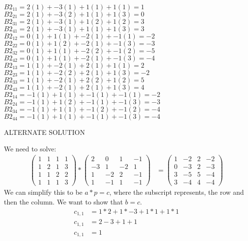 \documentclass[12pt]{article}
\begin{document}
\begin{itemize}
$B2_{11}=2(1)+-3(1)+1(1)+1(1)=1$
\newline $B2_{21}=2(1)+-3(2)+1(1)+1(3)=0$
\newline $B2_{31}=2(1)+-3(1)+1(2)+1(2)=3$
\newline $B2_{41}=2(1)+-3(1)+1(1)+1(3)=3$
\newline $B2_{12}=0(1)+1(1)+-2(1)+-1(1)=-2$
\newline $B2_{22}=0(1)+1(2)+-2(1)+-1(3)=-3$
\newline $B2_{32}=0(1)+1(1)+-2(2)+-1(2)=-5$
\newline $B2_{42}=0(1)+1(1)+-2(1)+-1(3)=-4$
\newline $B2_{13}=1(1)+-2(1)+2(1)+1(1)=2$
\newline $B2_{23}=1(1)+-2(2)+2(1)+1(3)=-2$
\newline $B2_{33}=1(1)+-2(1)+2(2)+1(2)=5$
\newline $B2_{43}=1(1)+-2(1)+2(1)+1(3)=4$
\newline $B2_{14}=-1(1)+1(1)+-1(1)+-1(1)=-2$
\newline $B2_{24}=-1(1)+1(2)+-1(1)+-1(3)=-3$
\newline $B2_{34}=-1(1)+1(1)+-1(2)+-1(2)=-4$
\newline $B2_{44}=-1(1)+1(1)+-1(1)+-1(3)=-4$

ALTERNATE SOLUTION

We need to solve: 
\begin{align*}
    \begin{pmatrix}
    1 & 1 & 1 & 1\\
    1 & 2 & 1 & 3 \\
    1 & 1 & 2 & 2 \\
    1 & 1 & 1 & 3
    \end{pmatrix} *
    \begin{pmatrix}
    2 & 0 & 1 & -1\\
    -3 & 1 & -2 & 1 \\
    1 & -2 & 2 & -1 \\
    1 & -1 & 1 & -1
    \end{pmatrix} 
    &=  \begin{pmatrix}
    1 & -2 & 2 & -2\\
    0 & -3 & 2 & -3 \\
    3 & -5 & 5 & -4 \\
    3 & -4 & 4 & -4 
    \end{pmatrix}
\end{align*}
We can simplify this to be $a * p = c$, where the subscript represents, the row and then the column. We want to show that $b = c$.
\begin{align*}
    c_{1,1} &= 1 * 2 + 1 * -3 + 1 * 1 + 1 * 1 \\
    c_{1,1} &= 2 - 3 + 1 + 1 \\
    c_{1,1} &= 1 \\
\end{align*}


\end{itemize}
\end{document}
